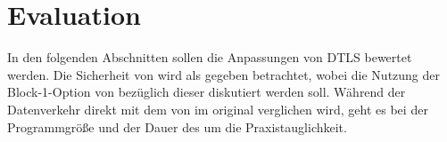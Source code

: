 \chapter{Evaluation}

In den folgenden Abschnitten sollen die Anpassungen von DTLS bewertet werden. Die Sicherheit von  wird als gegeben betrachtet, wobei
die Nutzung der Block-1-Option von  bezüglich dieser diskutiert werden soll. Während der Datenverkehr direkt mit dem von
 im original verglichen wird, geht es bei der Programmgröße und der Dauer des  um die Praxistauglichkeit.




